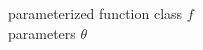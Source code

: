 \documentclass[preview]{standalone}
\begin{document}
parameterized function class $f$\\parameters $\theta$\\
\end{document}
